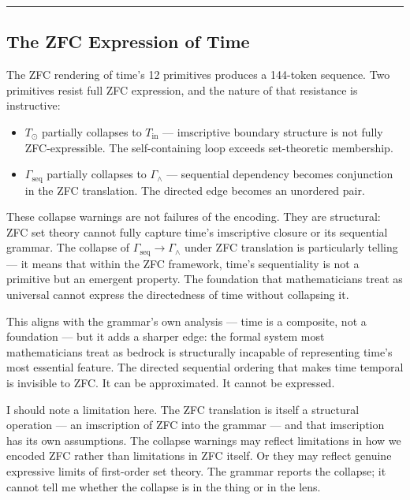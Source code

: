 \documentclass[12pt,a4paper]{article}
\begin{document}
\begin{center}
\rule{0.5\textwidth}{0.4pt}
\end{center}

\subsection{The ZFC Expression of Time}

The ZFC rendering of time's 12 primitives produces a 144-token sequence. Two primitives resist full ZFC expression, and the nature of that resistance is instructive:

\begin{itemize}
    \item $T_{\odot}$ partially collapses to $T_\text{in}$ --- imscriptive boundary structure is not fully ZFC-expressible. The self-containing loop exceeds set-theoretic membership.
    \item $\Gamma_\text{seq}$ partially collapses to $\Gamma_{\wedge}$ --- sequential dependency becomes conjunction in the ZFC translation. The directed edge becomes an unordered pair.
\end{itemize}

These collapse warnings are not failures of the encoding. They are structural: ZFC set theory cannot fully capture time's imscriptive closure or its sequential grammar. The collapse of $\Gamma_\text{seq} \to \Gamma_{\wedge}$ under ZFC translation is particularly telling --- it means that within the ZFC framework, time's sequentiality is not a primitive but an emergent property. The foundation that mathematicians treat as universal cannot express the directedness of time without collapsing it.

This aligns with the grammar's own analysis --- time is a composite, not a foundation --- but it adds a sharper edge: the formal system most mathematicians treat as bedrock is structurally incapable of representing time's most essential feature. The directed sequential ordering that makes time temporal is invisible to ZFC. It can be approximated. It cannot be expressed.

I should note a limitation here. The ZFC translation is itself a structural operation --- an imscription of ZFC into the grammar --- and that imscription has its own assumptions. The collapse warnings may reflect limitations in how we encoded ZFC rather than limitations in ZFC itself. Or they may reflect genuine expressive limits of first-order set theory. The grammar reports the collapse; it cannot tell me whether the collapse is in the thing or in the lens.
\end{document}
